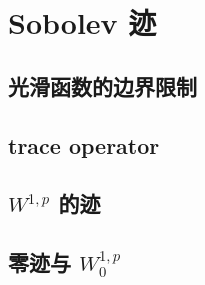 \section{Sobolev 迹}
\label{b1:sec:2301}


\subsection{光滑函数的边界限制}
\label{b1:subsec:230101}

\subsection{trace operator}
\label{b1:subsec:230102}

\subsection{\texorpdfstring{\(W^{1,p}\)}{W1,p} 的迹}
\label{b1:subsec:230103}

\subsection{零迹与 \texorpdfstring{\(W_0^{1,p}\)}{W01,p}}
\label{b1:subsec:230104}


